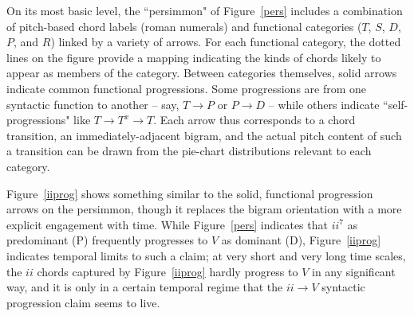 On its most basic level, the ``persimmon" of Figure~\ref{pers} includes a combination of pitch-based chord labels (roman numerals) and functional categories ($T$, $S$, $D$, $P$, and $R$) linked by a variety of arrows.  For each functional category, the dotted lines on the figure provide a mapping indicating the kinds of chords likely to appear as members of the category.  Between categories themselves, solid arrows indicate common functional progressions.  Some progressions are from one syntactic function to another -- say, $T \rightarrow P$ or $P \rightarrow D$ -- while others indicate ``self-progressions" like $T \rightarrow T^x \rightarrow T$.  Each arrow thus corresponds to a chord transition, an immediately-adjacent bigram, and the actual pitch content of such a transition can be drawn from the pie-chart distributions relevant to each category.

Figure~\ref{iiprog} shows something similar to the solid, functional progression arrows on the persimmon, though it replaces the bigram orientation with a more explicit engagement with time.  While Figure~\ref{pers} indicates that $ii^7$ as predominant (P) frequently progresses to $V$ as dominant (D), Figure~\ref{iiprog} indicates temporal limits to such a claim; at very short and very long time scales, the $ii$ chords captured by Figure~\ref{iiprog} hardly progress to $V$ in any significant way, and it is only in a certain temporal regime that the $ii \rightarrow V$ syntactic progression claim seems to live.

